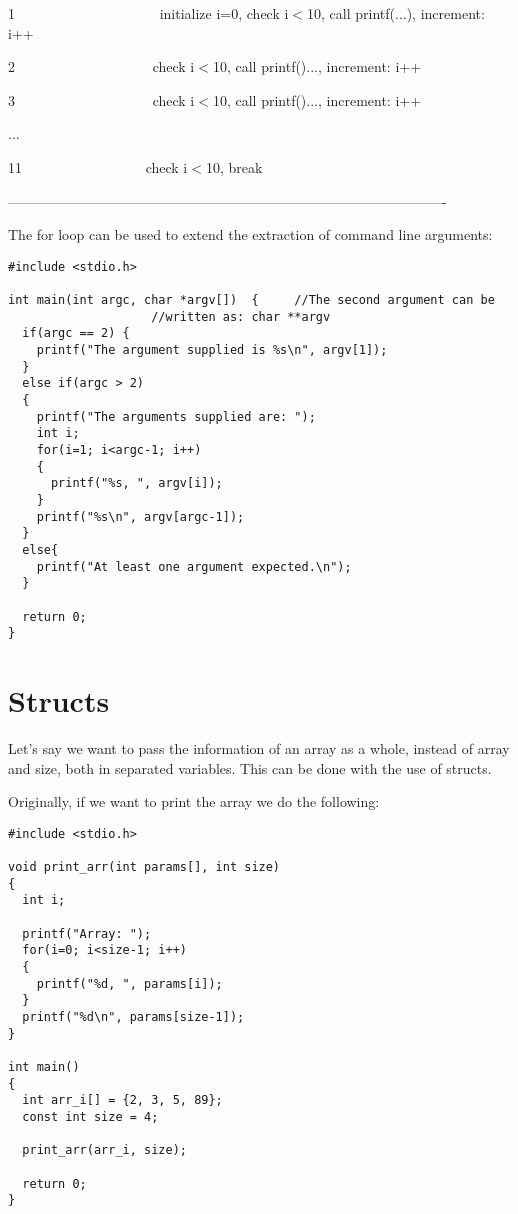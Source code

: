 \documentclass[11pt]{article}
\begin{document}
1 \ \  \ \ \ \  \ \ \ \ \ \ \ \ \ \ \ \ \ \ initialize i=0, check i$<$10, call printf(...), increment: i++

2 \  \ \ \ \  \ \ \ \ \ \ \ \ \ \ \ \ \ \ check i$<$10, call printf()..., increment: i++

3 \  \ \ \ \  \ \ \ \ \ \ \ \ \ \ \ \ \ \ check i$<$10, call printf()..., increment: i++

...

11 \  \ \ \ \  \ \ \ \ \ \ \ \ \ \ \ \ check i$<$10, break

----------------------------------------------------------------------------------------------

The for loop can be used to extend the extraction of command line arguments:

\begin{lstlisting}
#include <stdio.h>

int main(int argc, char *argv[])  { 	//The second argument can be
					//written as: char **argv
  if(argc == 2) {
    printf("The argument supplied is %s\n", argv[1]);
  }
  else if(argc > 2)
  {
    printf("The arguments supplied are: ");
    int i;
    for(i=1; i<argc-1; i++)
    {
      printf("%s, ", argv[i]);
    }
    printf("%s\n", argv[argc-1]);
  }
  else{
    printf("At least one argument expected.\n");
  }

  return 0;
}
\end{lstlisting}


\section{Structs}

Let's say we want to pass the information of an array as a whole, instead of array and size, both in separated variables. This can be done with the use of structs.

Originally, if we want to print the array we do the following:

\begin{lstlisting}
#include <stdio.h>

void print_arr(int params[], int size)
{
  int i;

  printf("Array: ");
  for(i=0; i<size-1; i++)
  {
    printf("%d, ", params[i]);
  }
  printf("%d\n", params[size-1]);
}

int main()
{
  int arr_i[] = {2, 3, 5, 89};
  const int size = 4;

  print_arr(arr_i, size);

  return 0;
}
\end{lstlisting}
\end{document}
